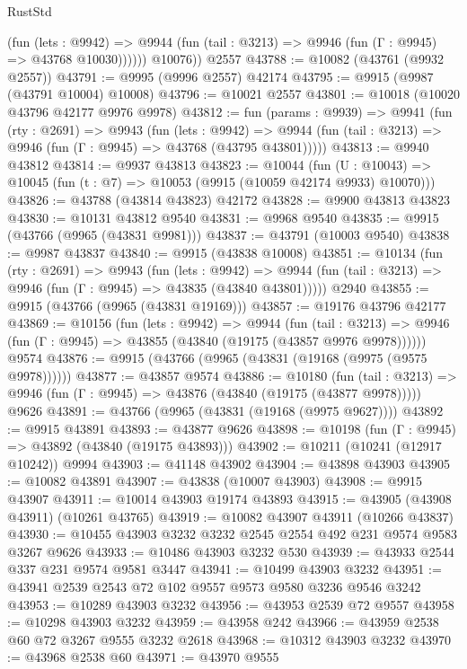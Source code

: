 \begin{lexlean}{RustStd}
\begin{coremodule}
              (fun (lets : @9942) =>
              @9944 (fun (tail : @3213) => @9946 (fun (Γ : @9945) => @43768 @10030))))))
        @10076))
    @2557
@43788 := @10082 (@43761 (@9932 @2557))
@43791 := @9995 (@9996 @2557) @42174
@43795 := @9915 (@9987 (@43791 @10004) @10008)
@43796 := @10021 @2557
@43801 := @10018 (@10020 @43796 @42177 @9976 @9978)
@43812 := fun (params : @9939) =>
  @9941
    (fun (rty : @2691) =>
    @9943
      (fun (lets : @9942) =>
      @9944 (fun (tail : @3213) => @9946 (fun (Γ : @9945) => @43768 (@43795 @43801)))))
@43813 := @9940 @43812
@43814 := @9937 @43813
@43823 := @10044
    (fun (U : @10043) => @10045 (fun (t : @7) => @10053 (@9915 (@10059 @42174 @9933) @10070)))
@43826 := @43788 (@43814 @43823) @42172
@43828 := @9900 @43813 @43823
@43830 := @10131 @43812 @9540
@43831 := @9968 @9540
@43835 := @9915 (@43766 (@9965 (@43831 @9981)))
@43837 := @43791 (@10003 @9540)
@43838 := @9987 @43837
@43840 := @9915 (@43838 @10008)
@43851 := @10134
    (fun (rty : @2691) =>
    @9943
      (fun (lets : @9942) =>
      @9944 (fun (tail : @3213) => @9946 (fun (Γ : @9945) => @43835 (@43840 @43801)))))
    @2940
@43855 := @9915 (@43766 (@9965 (@43831 @19169)))
@43857 := @19176 @43796 @42177
@43869 := @10156
    (fun (lets : @9942) =>
    @9944
      (fun (tail : @3213) =>
      @9946 (fun (Γ : @9945) => @43855 (@43840 (@19175 (@43857 @9976 @9978))))))
    @9574
@43876 := @9915 (@43766 (@9965 (@43831 (@19168 (@9975 (@9575 @9978))))))
@43877 := @43857 @9574
@43886 := @10180
    (fun (tail : @3213) => @9946 (fun (Γ : @9945) => @43876 (@43840 (@19175 (@43877 @9978)))))
    @9626
@43891 := @43766 (@9965 (@43831 (@19168 (@9975 @9627))))
@43892 := @9915 @43891
@43893 := @43877 @9626
@43898 := @10198 (fun (Γ : @9945) => @43892 (@43840 (@19175 @43893)))
@43902 := @10211 (@10241 (@12917 @10242)) @9994
@43903 := @41148 @43902
@43904 := @43898 @43903
@43905 := @10082 @43891
@43907 := @43838 (@10007 @43903)
@43908 := @9915 @43907
@43911 := @10014 @43903 @19174 @43893
@43915 := @43905 (@43908 @43911) (@10261 @43765)
@43919 := @10082 @43907 @43911 (@10266 @43837)
@43930 := @10455 @43903 @3232 @3232 @2545 @2554 @492 @231 @9574 @9583 @3267 @9626
@43933 := @10486 @43903 @3232 @530
@43939 := @43933 @2544 @337 @231 @9574 @9581 @3447
@43941 := @10499 @43903 @3232
@43951 := @43941 @2539 @2543 @72 @102 @9557 @9573 @9580 @3236 @9546 @3242
@43953 := @10289 @43903 @3232
@43956 := @43953 @2539 @72 @9557
@43958 := @10298 @43903 @3232
@43959 := @43958 @242
@43966 := @43959 @2538 @60 @72 @3267 @9555 @3232 @2618
@43968 := @10312 @43903 @3232
@43970 := @43968 @2538 @60
@43971 := @43970 @9555

\end{coremodule}
\end{lexlean}
